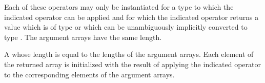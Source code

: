\begin{itemdescr}
\pnum
\requires
Each of these operators may only be instantiated for a type 
to which the indicated operator can be applied and for which the indicated
operator returns a value which is of type  or which
can be unambiguously implicitly converted to type .
The argument arrays have the same length.

\pnum
\returns
A  whose length is equal to the
lengths of the argument arrays.
Each element of the returned array is
initialized with the result of applying the indicated operator to the
corresponding elements of the argument arrays.
\end{itemdescr}

%
%
%
%
%
%
%
%
%
%
